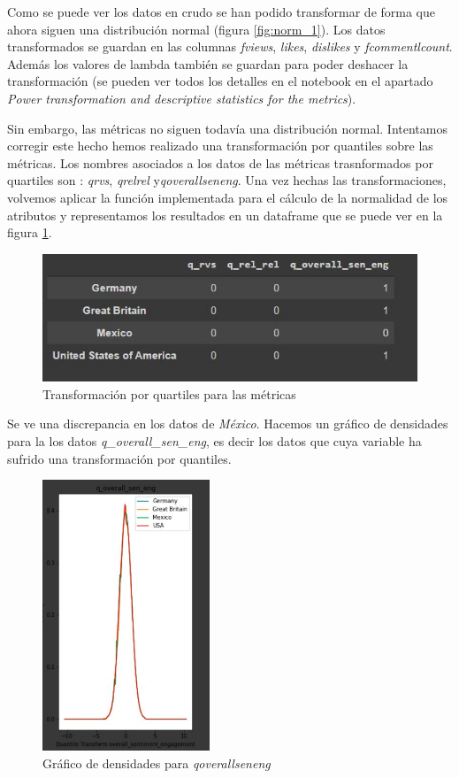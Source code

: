 \documentclass[a4paper,12pt]{article}
\begin{document}
Como se puede ver los datos en crudo se han podido transformar de forma que ahora siguen una distribuci\'on normal (figura \ref{fig:norm_1}). Los datos transformados se guardan en las columnas {\itshape fviews}, {\itshape likes}, {\itshape dislikes} y {\itshape fcommentl{\textunderscore}count}. Adem\'as los valores de lambda tambi\'en se guardan para poder deshacer la transformaci\'on (se pueden ver todos los detalles en el notebook en el apartado {\itshape Power transformation and descriptive statistics for the metrics}).

Sin embargo, las m\'etricas no siguen todav\'ia una distribuci\'on normal. Intentamos corregir este hecho hemos realizado una transformaci\'on por quantiles sobre las m\'etricas. Los nombres asociados a los datos de las m\'etricas trasnformados por quartiles son : {\itshape q{\textunderscore}rvs}, {\itshape q{\textunderscore}rel{\textunderscore}rel} y{\itshape q{\textunderscore}overall{\textunderscore}sen{\textunderscore}eng}. Una vez hechas las transformaciones, volvemos aplicar la funci\'on implementada para el c\'alculo de la normalidad de los atributos y representamos los resultados en un dataframe que se puede ver en la figura \ref{fig:quar}.

\begin{figure}[h!]
\centering
\includegraphics[width=12cm]{dataframe_3.JPG}
\caption{Transformaci\'on por quartiles para las m\'etricas}
\label{fig:quar}
\end{figure}

Se ve una discrepancia en los datos de {\itshape M\'exico}. Hacemos un gr\'afico de densidades para la los datos {\itshape q\_overall\_sen\_eng}, es decir los datos que cuya variable  ha sufrido una transformaci\'on por quantiles.

\begin{figure}[h!]
\centering
\includegraphics[width=5cm]{grafica_transformada.JPG}
\caption{Gr\'afico de densidades para {\itshape q{\textunderscore}overall{\textunderscore}sen{\textunderscore}eng}}
\label{fig:quart_2}
\end{figure}
\end{document}
